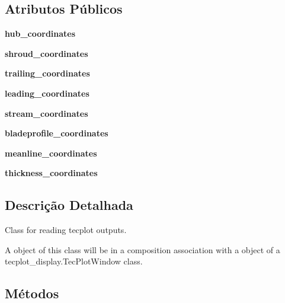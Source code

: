 \subsection*{Atributos Públicos}
\begin{DoxyCompactItemize}
\item 
\hypertarget{a00122_a2ccc38e7f7503e06d5c5fad58a071f80}{}\label{a00122_a2ccc38e7f7503e06d5c5fad58a071f80} 
{\bfseries hub\+\_\+coordinates}
\item 
\hypertarget{a00122_a583d4851d722f76e18ec7841357b4ea7}{}\label{a00122_a583d4851d722f76e18ec7841357b4ea7} 
{\bfseries shroud\+\_\+coordinates}
\item 
\hypertarget{a00122_ab6edfe4cfa33db98eb1414228f78a303}{}\label{a00122_ab6edfe4cfa33db98eb1414228f78a303} 
{\bfseries trailing\+\_\+coordinates}
\item 
\hypertarget{a00122_af991756a166df02da0a122d8d7c5c372}{}\label{a00122_af991756a166df02da0a122d8d7c5c372} 
{\bfseries leading\+\_\+coordinates}
\item 
\hypertarget{a00122_a4c8e60241684e96d45eabfb99e6955fd}{}\label{a00122_a4c8e60241684e96d45eabfb99e6955fd} 
{\bfseries stream\+\_\+coordinates}
\item 
\hypertarget{a00122_abd9898f018cbb1686522d50721f851a7}{}\label{a00122_abd9898f018cbb1686522d50721f851a7} 
{\bfseries bladeprofile\+\_\+coordinates}
\item 
\hypertarget{a00122_a33fc4c19a7badee5e2a88f3be97f8efb}{}\label{a00122_a33fc4c19a7badee5e2a88f3be97f8efb} 
{\bfseries meanline\+\_\+coordinates}
\item 
\hypertarget{a00122_a894f4ab5042e885fa8349c50c37059ac}{}\label{a00122_a894f4ab5042e885fa8349c50c37059ac} 
{\bfseries thickness\+\_\+coordinates}
\end{DoxyCompactItemize}


\subsection{Descrição Detalhada}
\begin{DoxyVerb}Class for reading tecplot outputs.

A object of this class will be in a composition association with a object of a
tecplot_display.TecPlotWindow class.\end{DoxyVerb}
 

\subsection{Métodos}
\hypertarget{a00122_a9cf438934b57cd1d0bef90bcc00f27ac}{}\label{a00122_a9cf438934b57cd1d0bef90bcc00f27ac} 
